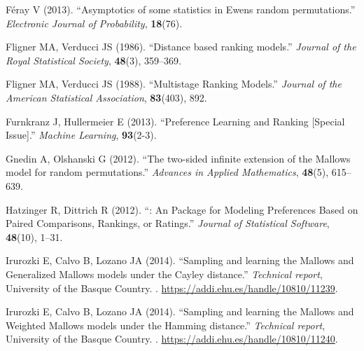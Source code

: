 \documentclass[article,nojss]{jss}
\begin{document}
\begin{thebibliography}{44}
F\'{e}ray V (2013).
\newblock \enquote{{Asymptotics of some statistics in Ewens random
  permutations}.}
\newblock \emph{Electronic Journal of Probability}, \textbf{18}(76).

Fligner MA, Verducci JS (1986).
\newblock \enquote{{Distance based ranking models}.}
\newblock \emph{Journal of the Royal Statistical Society}, \textbf{48}(3),
  359--369.

Fligner MA, Verducci JS (1988).
\newblock \enquote{{Multistage Ranking Models}.}
\newblock \emph{Journal of the American Statistical Association},
  \textbf{83}(403), 892.

Furnkranz J, Hullermeier E (2013).
\newblock \enquote{{Preference Learning and Ranking [Special Issue]}.}
\newblock \emph{Machine Learning}, \textbf{93}(2-3).

Gnedin A, Olshanski G (2012).
\newblock \enquote{{The two-sided infinite extension of the Mallows model for
  random permutations}.}
\newblock \emph{Advances in Applied Mathematics}, \textbf{48}(5), 615--639.

Hatzinger R, Dittrich R (2012).
\newblock \enquote{{: An 
  Package for Modeling Preferences Based on Paired Comparisons, Rankings, or
  Ratings}.}
\newblock \emph{Journal of Statistical Software}, \textbf{48}(10), 1--31.

Irurozki E, Calvo B, Lozano JA (2014{}).
\newblock \enquote{{Sampling and learning the Mallows and Generalized Mallows
  models under the Cayley distance}.}
\newblock \emph{Technical report}, University of the Basque Country.
\newblock {}.
\newblock \urlprefix\url{https://addi.ehu.es/handle/10810/11239}.

Irurozki E, Calvo B, Lozano JA (2014{}).
\newblock \enquote{{Sampling and learning the Mallows and Weighted Mallows
  models under the Hamming distance}.}
\newblock \emph{Technical report}, University of the Basque Country.
\newblock {}.
\newblock \urlprefix\url{https://addi.ehu.es/handle/10810/11240}.


\end{thebibliography}
\end{document}
